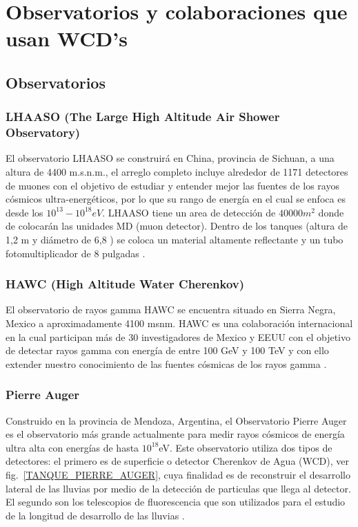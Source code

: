 \chapter{Observatorios y colaboraciones que usan WCD's}\label{OBSERVATORIOS_COLABORACIONES}
\section{Observatorios}
	\subsection{LHAASO (The Large High Altitude Air Shower Observatory)}\label{LHAASO}
	El observatorio LHAASO se construirá en China, provincia de Sichuan, a una altura de 4400 m.s.n.m., el arreglo completo incluye alrededor de 1171 detectores de muones con el objetivo de estudiar y entender mejor las fuentes de los rayos cósmicos ultra-energéticos, por lo que su rango de energía en el cual se enfoca es desde los $10^{13}-10^{18} eV$. LHAASO tiene un area de detección de $40000 m^{2}$ donde de colocarán las unidades MD (muon detector). Dentro de los tanques (altura de 1,2 m y diámetro de 6,8 ) se coloca un material altamente reflectante y un tubo fotomultiplicador de 8 pulgadas \cite{ZUO20181}.
	
	\subsection{HAWC (High Altitude Water Cherenkov)}\label{HAWC}
	El observatorio de rayos gamma HAWC se encuentra situado en Sierra Negra, Mexico a aproximadamente 4100 msnm. HAWC es una colaboración internacional en la cual participan más de 30 investigadores de Mexico y EEUU con el objetivo de detectar rayos gamma con energía de entre 100 GeV y 100 TeV y con ello extender nuestro conocimiento de las fuentes cósmicas de los rayos gamma \cite{Bonilla}.
	
	\subsection{Pierre Auger}\label{PIERRE_AUGER}
	Construido en la provincia de Mendoza, Argentina, el Observatorio Pierre Auger es el observatorio más grande actualmente para medir rayos cósmicos de energía ultra alta con energías de hasta $10^{18} $eV. Este observatorio utiliza dos tipos de detectores: el primero es de superficie o detector Cherenkov de Agua (WCD), ver fig.~\ref{TANQUE_PIERRE_AUGER}, cuya finalidad es de reconstruir el desarrollo lateral de las lluvias por medio de la detección de particulas que llega al detector. El segundo son los telescopios de fluorescencia que son utilizados para el estudio de la longitud de desarrollo de las lluvias \cite{A.C.Cobos}.

